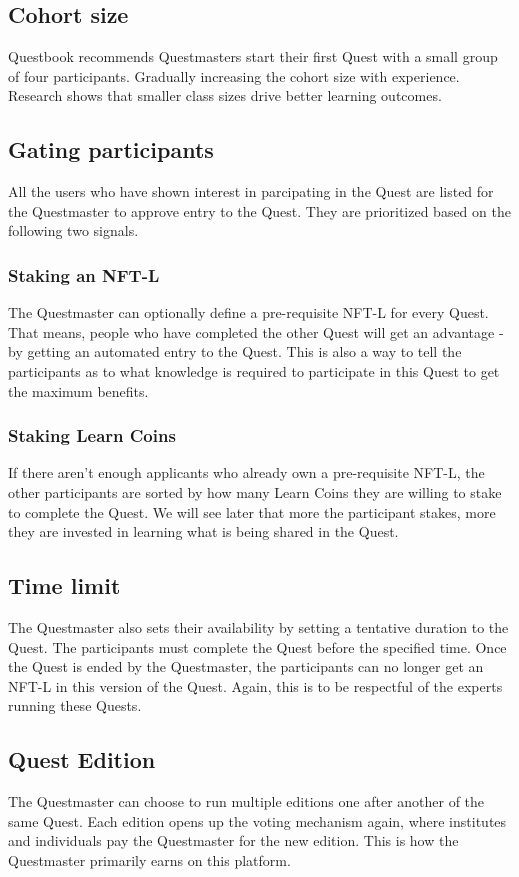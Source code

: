 \documentclass{article}
\begin{document}
    \subsection{Cohort size}
      Questbook recommends Questmasters start their first Quest with a small group of four participants. Gradually increasing the cohort size with experience. 
      Research shows that smaller class sizes drive better learning outcomes. %
    \subsection{Gating participants}
      All the users who have shown interest in parcipating in the Quest are listed for the Questmaster to approve entry to the Quest. They are prioritized based on the following two signals.
      \subsubsection{Staking an NFT-L}
        The Questmaster can optionally define a pre-requisite NFT-L for every Quest. That means, people who have completed the other Quest will get an advantage - by getting an automated entry to the Quest.
        This is also a way to tell the participants as to what knowledge is required to participate in this Quest to get the maximum benefits. 
      \subsubsection{Staking Learn Coins}
        If there aren't enough applicants who already own a pre-requisite NFT-L, the other participants are sorted by how many Learn Coins they are willing to stake to complete the Quest.
        We will see later that more the participant stakes, more they are invested in learning what is being shared in the Quest.
    \subsection{Time limit}
      The Questmaster also sets their availability by setting a tentative duration to the Quest. The participants must complete the Quest before the specified time. 
      Once the Quest is ended by the Questmaster, the participants can no longer get an NFT-L in this version of the Quest.
      Again, this is to be respectful of the experts running these Quests. 
    \subsection{Quest Edition}
      The Questmaster can choose to run multiple editions one after another of the same Quest. Each edition opens up the voting mechanism again, where institutes and individuals pay the Questmaster for the new edition. This is how the Questmaster primarily earns on this platform.
\end{document}
